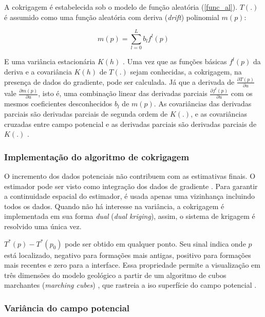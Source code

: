 A cokrigagem é estabelecida sob o modelo de função aleatória (\autoref{func_al}). $T(.)$ é assumido como uma função aleatória com deriva (\textit{drift}) polinomial $m(p)$:

\begin{equation}
	\label{eq_poli_drift}
    m(p)=\sum\limits_{l=0}^L b_lf^l(p)
\end{equation}

E uma variância estacionária $K(h)$ \cite{calcagno2008geological,renard2013modeling}. Uma vez que as funções básicas $f^l(p)$ da deriva e a covariância $K(h)$ de $T(.)$ sejam conhecidas, a cokrigagem, na presença de dados do gradiente, pode ser calculada. Já que a derivada de $\frac{\partial T(p)}{\partial u}$ vale $\frac{\partial m(p)}{\partial u}$, isto é, uma combinação linear das derivadas parciais $\frac{\partial f^l(p)}{\partial u}$ com os mesmos coeficientes desconhecidos $b_l$ de $m(p)$. As covariâncias das derivadas parciais são derivadas parciais de segunda ordem de $K(.)$, e as covariâncias cruzadas entre campo potencial e as derivadas parciais são derivadas parciais de $K(.)$ \cite{chiles2004modelling}.

\subsubsection{Implementação do algoritmo de cokrigagem}

O incremento dos dados potenciais não contribuem com as estimativas finais. O estimador pode ser visto como integração dos dados de gradiente \cite{chiles2004modelling}. Para garantir a continuidade espacial do estimador, é usada apenas uma vizinhança incluindo todos os dados. Quando não há interesse na variância, a cokrigagem é implementada em sua forma \textit{dual} (\textit{dual kriging}), assim, o sistema de krigagem é resolvido uma única vez. 

$T^*(p)-T^*(p_0)$ pode ser obtido em qualquer ponto. Seu sinal indica onde $p$ está localizado, negativo para formações mais antigas, positivo para formações mais recentes e zero para a interface. Essa propriedade permite a visualização em três dimensões do modelo geológico a partir de um algoritmo de cubos marchantes (\textit{marching cubes}) \cite{lorensen1987marching}, que rastreia a iso superfície do campo potencial \cite{calcagno2008geological}.

\subsubsection{Variância do campo potencial}

